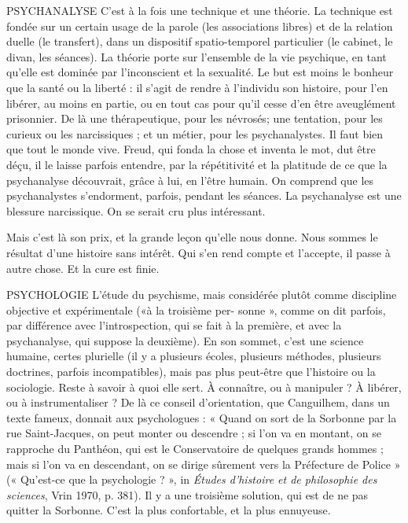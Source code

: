 PSYCHANALYSE C’est à la fois une technique et une théorie. La technique
est fondée sur un certain usage de la parole (les associations
libres) et de la relation duelle (le transfert), dans un dispositif spatio-temporel
particulier (le cabinet, le divan, les séances). La théorie porte sur
l’ensemble de la vie psychique, en tant qu’elle est dominée par l’inconscient
et la sexualité. Le but est moins le bonheur que la santé ou la liberté : il s’agit
de rendre à l'individu son histoire, pour l’en libérer, au moins en partie, ou
en tout cas pour qu'il cesse d’en être aveuglément prisonnier. De là une thérapeutique,
pour les névrosés; une tentation, pour les curieux ou les
narcissiques ; et un métier, pour les psychanalystes. Il faut bien que tout le
monde vive.
Freud, qui fonda la chose et inventa le mot, dut être déçu, il le laisse parfois
entendre, par la répétitivité et la platitude de ce que la psychanalyse découvrait,
grâce à lui, en l’être humain. On comprend que les psychanalystes s’endorment,
parfois, pendant les séances. La psychanalyse est une blessure narcissique.
On se serait cru plus intéressant.

Mais c’est là son prix, et la grande leçon qu’elle nous donne. Nous sommes
le résultat d’une histoire sans intérêt. Qui s’en rend compte et l’accepte, il passe
à autre chose. Et la cure est finie.

PSYCHOLOGIE L'étude du psychisme, mais considérée plutôt comme discipline
objective et expérimentale («à la troisième per-
sonne », comme on dit parfois, par différence avec l’introspection, qui se fait à
la première, et avec la psychanalyse, qui suppose la deuxième). En son sommet,
c’est une science humaine, certes plurielle (il y a plusieurs écoles, plusieurs
méthodes, plusieurs doctrines, parfois incompatibles), mais pas plus peut-être
que l’histoire ou la sociologie. Reste à savoir à quoi elle sert. À connaître, ou à
manipuler ? À libérer, ou à instrumentaliser ? De là ce conseil d’orientation,
que Canguilhem, dans un texte fameux, donnait aux psychologues : « Quand
on sort de la Sorbonne par la rue Saint-Jacques, on peut monter ou descendre ;
si l’on va en montant, on se rapproche du Panthéon, qui est le Conservatoire
de quelques grands hommes ; mais si l’on va en descendant, on se dirige sûrement
vers la Préfecture de Police » (« Qu'est-ce que la psychologie ? », in {\it Études
d'histoire et de philosophie des sciences}, Vrin 1970, p. 381). Il y a une troisième
solution, qui est de ne pas quitter la Sorbonne. C’est la plus confortable, et la
plus ennuyeuse.

